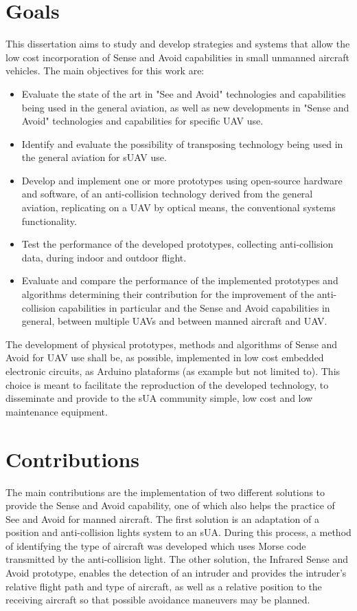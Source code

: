 \section{Goals}
\label{section:goals}

This dissertation aims to study and develop strategies and systems that allow the low cost incorporation of Sense and Avoid capabilities in small unmanned aircraft vehicles. The main objectives for this work are:
\begin{itemize}
\item Evaluate the state of the art in "See and Avoid" technologies and capabilities being used in the general aviation, as well as new developments in "Sense and Avoid" technologies and capabilities for specific UAV use.
\item Identify and evaluate the possibility of transposing technology being used in the general aviation for sUAV use.
\item Develop and implement one or more prototypes using open-source hardware and software, of an anti-collision technology derived from the general aviation, replicating on a UAV by optical means, the conventional systems functionality.
\item Test the performance of the developed prototypes, collecting anti-collision data, during indoor and outdoor flight.
\item Evaluate and compare the performance of the implemented prototypes and algorithms determining their contribution for the improvement of the anti-collision capabilities in particular and the Sense and Avoid capabilities in general, between multiple UAVs and between manned aircraft and UAV.
\end{itemize}
The development of physical prototypes, methods and algorithms of Sense and Avoid for UAV use shall be, as possible, implemented in low cost embedded electronic circuits, as Arduino plataforms (as example but not limited to). This choice is meant to facilitate the reproduction of the developed technology, to disseminate and provide to the sUA community simple, low cost and low maintenance equipment.\\


\section{Contributions}
\label{section:contributions}
The main contributions are the implementation of two different solutions to provide the Sense and Avoid capability, one of which also helps the practice of See and Avoid for manned aircraft. The first solution is an adaptation of a position and anti-collision lights system to an sUA. During this process, a method of identifying the type of aircraft was developed which uses Morse code transmitted by the anti-collision light. The other solution, the Infrared Sense and Avoid prototype, enables the detection of an intruder and provides the intruder's relative flight path and type of aircraft, as well as a relative position to the receiving aircraft so that possible avoidance maneuvers may be planned.

